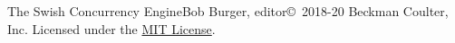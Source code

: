 \documentclass[letterpaper,11pt,twoside,final]{report}
\begin{document}
\begin{sagianbook}{The Swish Concurrency Engine}{Bob Burger,
    editor}{\copyright\ 2018-20 Beckman Coulter, Inc.
    Licensed under the \href{https://opensource.org/licenses/MIT}{MIT License}.}



\end{sagianbook}
\end{document}
